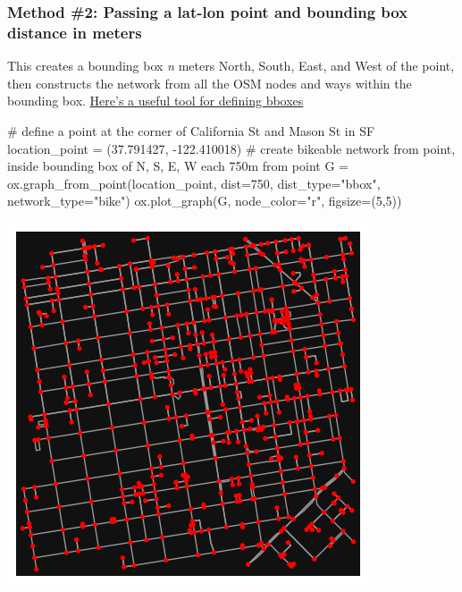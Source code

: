 \documentclass[
  letterpaper,
  DIV=11,
  numbers=noendperiod]{scrreprt}
\newenvironment{Shaded}{\begin{snugshade}}{\end{snugshade}}
\newcommand{\CommentTok}[1]{\textcolor[rgb]{0.37,0.37,0.37}{#1}}
\newcommand{\DecValTok}[1]{\textcolor[rgb]{0.68,0.00,0.00}{#1}}
\newcommand{\FloatTok}[1]{\textcolor[rgb]{0.68,0.00,0.00}{#1}}
\newcommand{\NormalTok}[1]{\textcolor[rgb]{0.00,0.23,0.31}{#1}}
\newcommand{\OperatorTok}[1]{\textcolor[rgb]{0.37,0.37,0.37}{#1}}
\newcommand{\StringTok}[1]{\textcolor[rgb]{0.13,0.47,0.30}{#1}}
\begin{document}
\subsubsection{Method \#2: Passing a lat-lon point and bounding box
distance in
meters}\label{method-2-passing-a-lat-lon-point-and-bounding-box-distance-in-meters}

This creates a bounding box \emph{n} meters North, South, East, and West
of the point, then constructs the network from all the OSM nodes and
ways within the bounding box. \href{https://bboxfinder.com}{Here's a
useful tool for defining bboxes}

\begin{Shaded}
\begin{Highlighting}[]
\CommentTok{\# define a point at the corner of California St and Mason St in SF}
\NormalTok{location\_point }\OperatorTok{=}\NormalTok{ (}\FloatTok{37.791427}\NormalTok{, }\OperatorTok{{-}}\FloatTok{122.410018}\NormalTok{)}
\CommentTok{\# create bikeable network from point, inside bounding box of N, S, E, W each 750m from point}
\NormalTok{G }\OperatorTok{=}\NormalTok{ ox.graph\_from\_point(location\_point, dist}\OperatorTok{=}\DecValTok{750}\NormalTok{, dist\_type}\OperatorTok{=}\StringTok{"bbox"}\NormalTok{, network\_type}\OperatorTok{=}\StringTok{"bike"}\NormalTok{)}
\NormalTok{ox.plot\_graph(G, node\_color}\OperatorTok{=}\StringTok{"r"}\NormalTok{, figsize}\OperatorTok{=}\NormalTok{(}\DecValTok{5}\NormalTok{,}\DecValTok{5}\NormalTok{))}
\end{Highlighting}
\end{Shaded}

\includegraphics{labs/w07_OSM_files/figure-pdf/cell-7-output-1.png}
\end{document}
